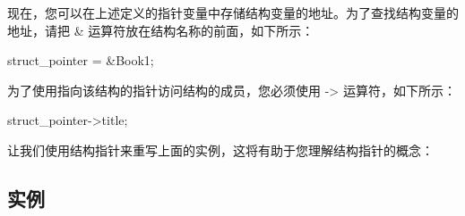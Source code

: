 \documentclass[
]{article}
\newenvironment{Shaded}{}{}
\newcommand{\NormalTok}[1]{#1}
\newcommand{\OperatorTok}[1]{\textcolor[rgb]{0.40,0.40,0.40}{#1}}
\begin{document}
现在，您可以在上述定义的指针变量中存储结构变量的地址。为了查找结构变量的地址，请把
\& 运算符放在结构名称的前面，如下所示：

\begin{Shaded}
\begin{Highlighting}[]
\NormalTok{struct\_pointer }\OperatorTok{=} \OperatorTok{\&}\NormalTok{Book1}\OperatorTok{;}
\end{Highlighting}
\end{Shaded}

为了使用指向该结构的指针访问结构的成员，您必须使用 -\textgreater{}
运算符，如下所示：

\begin{Shaded}
\begin{Highlighting}[]
\NormalTok{struct\_pointer}\OperatorTok{{-}\textgreater{}}\NormalTok{title}\OperatorTok{;}
\end{Highlighting}
\end{Shaded}

让我们使用结构指针来重写上面的实例，这将有助于您理解结构指针的概念：

\hypertarget{ux5b9eux4f8b-17}{%
\subsection{实例}\label{ux5b9eux4f8b-17}}
\end{document}
